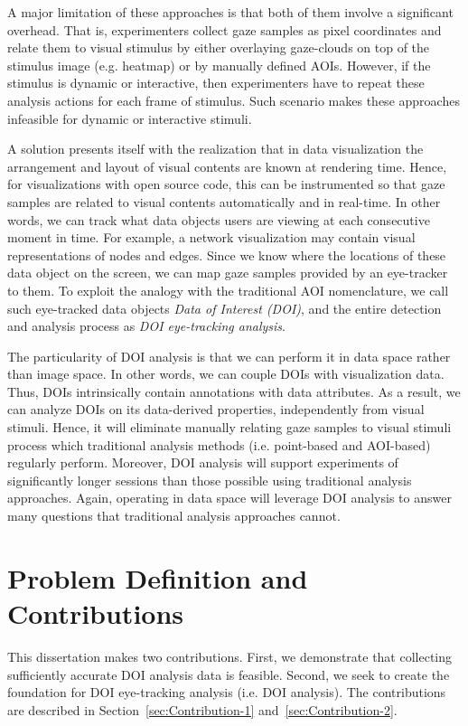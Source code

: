 A major limitation of these approaches is that both of them involve a significant overhead. That is, experimenters collect gaze samples as pixel coordinates and relate them to visual stimulus by either overlaying gaze-clouds on top of the stimulus image (e.g. heatmap) or by manually defined AOIs. However, if the stimulus is dynamic or interactive, then experimenters have to repeat these analysis actions for each frame of stimulus. Such scenario makes these approaches infeasible for dynamic or interactive stimuli.

A solution presents itself with the realization that in data visualization the arrangement and layout of visual contents are known at rendering time. Hence, for visualizations with open source code, this can be instrumented so that gaze samples are related to visual contents automatically and in real-time. In other words, we can track what data objects users are viewing at each consecutive moment in time. For example, a network visualization may contain visual representations of nodes and edges. Since we know where the locations of these data object on the screen, we can map gaze samples provided by an eye-tracker to them. To exploit the analogy with the traditional AOI nomenclature, we call such eye-tracked data objects \textit{Data of Interest (DOI)}, and the entire detection and analysis process as \textit{DOI eye-tracking analysis}. 

The particularity of DOI analysis is that we can perform it in data space rather than image space. In other words, we can couple DOIs with visualization data. Thus, DOIs intrinsically contain annotations with data attributes. As a result, we can analyze DOIs on its data-derived properties, independently from visual stimuli. Hence, it will eliminate manually relating gaze samples to visual stimuli process which traditional analysis methods (i.e. point-based and AOI-based) regularly perform. Moreover, DOI analysis will support experiments of significantly longer sessions than those possible using traditional analysis approaches. Again, operating in data space will leverage DOI analysis to answer many questions that traditional analysis approaches cannot. 

\section{Problem Definition and Contributions}
\label{sec:ProblemContribution}
This dissertation makes two contributions. First, we demonstrate that collecting sufficiently accurate DOI analysis data is feasible. Second, we seek to create the foundation for DOI eye-tracking analysis (i.e. DOI analysis). The contributions are described in Section~\ref{sec:Contribution-1} and~\ref{sec:Contribution-2}. 

